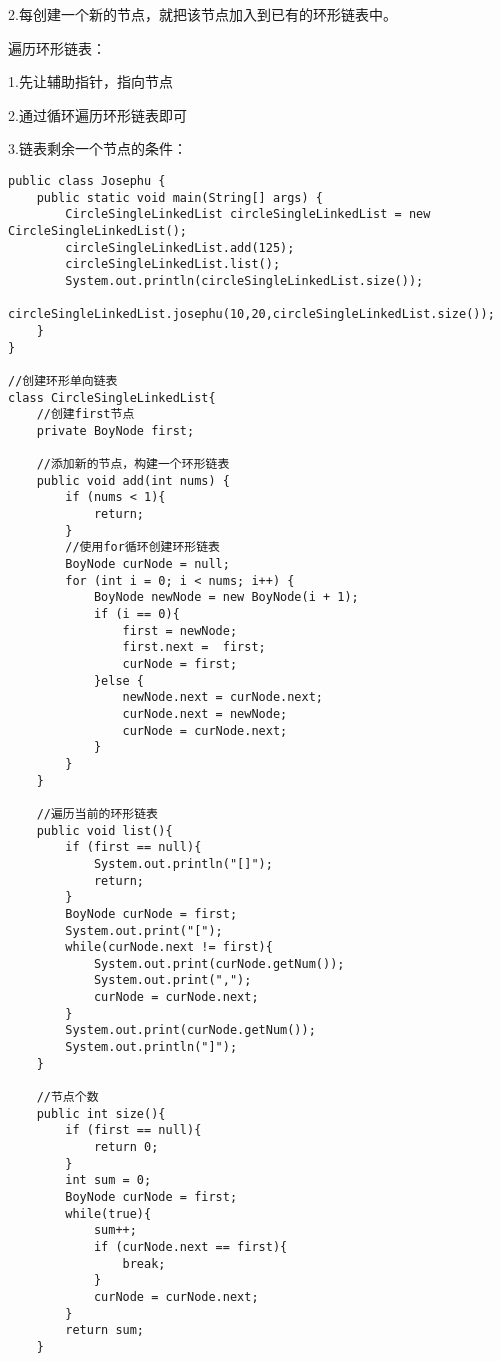 \documentclass[a4paper]{report}
\begin{document}
2.每创建一个新的节点，就把该节点加入到已有的环形链表中。

遍历环形链表：

1.先让辅助指针，指向节点

2.通过循环遍历环形链表即可

3.链表剩余一个节点的条件：

\begin{lstlisting}
public class Josephu {
    public static void main(String[] args) {
        CircleSingleLinkedList circleSingleLinkedList = new CircleSingleLinkedList();
        circleSingleLinkedList.add(125);
        circleSingleLinkedList.list();
        System.out.println(circleSingleLinkedList.size());
        circleSingleLinkedList.josephu(10,20,circleSingleLinkedList.size());
    }
}

//创建环形单向链表
class CircleSingleLinkedList{
    //创建first节点
    private BoyNode first;

    //添加新的节点，构建一个环形链表
    public void add(int nums) {
        if (nums < 1){
            return;
        }
        //使用for循环创建环形链表
        BoyNode curNode = null;
        for (int i = 0; i < nums; i++) {
            BoyNode newNode = new BoyNode(i + 1);
            if (i == 0){
                first = newNode;
                first.next =  first;
                curNode = first;
            }else {
                newNode.next = curNode.next;
                curNode.next = newNode;
                curNode = curNode.next;
            }
        }
    }

    //遍历当前的环形链表
    public void list(){
        if (first == null){
            System.out.println("[]");
            return;
        }
        BoyNode curNode = first;
        System.out.print("[");
        while(curNode.next != first){
            System.out.print(curNode.getNum());
            System.out.print(",");
            curNode = curNode.next;
        }
        System.out.print(curNode.getNum());
        System.out.println("]");
    }

    //节点个数
    public int size(){
        if (first == null){
            return 0;
        }
        int sum = 0;
        BoyNode curNode = first;
        while(true){
            sum++;
            if (curNode.next == first){
                break;
            }
            curNode = curNode.next;
        }
        return sum;
    }


\end{lstlisting}
\end{document}

